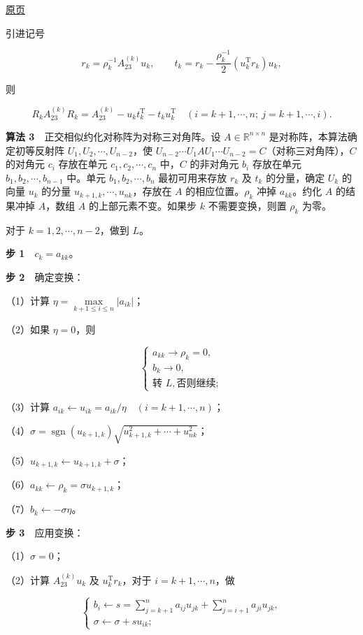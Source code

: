 \documentclass[
  10pt,
  fontset=fandol]{ctexart}
\begin{document}
\href{../../source-images/pdf-248.jpeg}{原页}

引进记号

\[
r_k=\rho_k^{-1}A_{23}^{(k)}u_k,\qquad
 t_k=r_k-\frac{\rho_k^{-1}}2(u_k^{\mathrm T}r_k)u_k,
\]

则

\[
R_kA_{23}^{(k)}R_k=A_{23}^{(k)}-u_kt_k^{\mathrm T}-t_ku_k^{\mathrm T}
\quad(i=k+1,\cdots,n;\ j=k+1,\cdots,i).
\]

\textbf{算法 3}　正交相似约化对称阵为对称三对角阵。设 \(A\in\mathbb R^{n\times n}\) 是对称阵，本算法确定初等反射阵 \(U_1,U_2,\cdots,U_{n-2}\)，使 \(U_{n-2}\cdots U_1AU_1\cdots U_{n-2}=C\)（对称三对角阵），\(C\) 的对角元 \(c_i\) 存放在单元 \(c_1,c_2,\cdots,c_n\) 中，\(C\) 的非对角元 \(b_i\) 存放在单元 \(b_1,b_2,\cdots,b_{n-1}\) 中。单元 \(b_1,b_2,\cdots,b_n\) 最初可用来存放 \(r_k\) 及 \(t_k\) 的分量，确定 \(U_k\) 的向量 \(u_k\) 的分量 \(u_{k+1,k},\cdots,u_{nk}\)，存放在 \(A\) 的相应位置。\(\rho_k\) 冲掉 \(a_{kk}\)。约化 \(A\) 的结果冲掉 \(A\)，数组 \(A\) 的上部元素不变。如果步 \(k\) 不需要变换，则置 \(\rho_k\) 为零。

对于 \(k=1,2,\cdots,n-2\)，做到 \(L\)。

\textbf{步 1}　\(c_k=a_{kk}\)。

\textbf{步 2}　确定变换：

（1）计算 \(\eta=\max\limits_{k+1\leq i\leq n}|a_{ik}|\)；

（2）如果 \(\eta=0\)，则

\[
\begin{cases}
a_{kk}\to\rho_k=0,\\
b_k\to0,\\
\text{转 }L,\text{否则继续};
\end{cases}
\]

（3）计算 \(a_{ik}\leftarrow u_{ik}=a_{ik}/\eta\quad(i=k+1,\cdots,n)\)；

（4）\(\sigma=\operatorname{sgn}(u_{k+1,k})\sqrt{u_{k+1,k}^2+\cdots+u_{nk}^2}\)；

（5）\(u_{k+1,k}\leftarrow u_{k+1,k}+\sigma\)；

（6）\(a_{kk}\leftarrow\rho_k=\sigma u_{k+1,k}\)；

（7）\(b_k\leftarrow-\sigma\eta\)。

\textbf{步 3}　应用变换：

（1）\(\sigma=0\)；

（2）计算 \(A_{23}^{(k)}u_k\) 及 \(u_k^{\mathrm T}r_k\)，对于 \(i=k+1,\cdots,n\)，做

\[
\begin{cases}
b_i\leftarrow s=\displaystyle\sum_{j=k+1}^{n}a_{ij}u_{jk}+\displaystyle\sum_{j=i+1}^{n}a_{ji}u_{jk},\\
\sigma\leftarrow\sigma+su_{ik};
\end{cases}
\]
\end{document}
